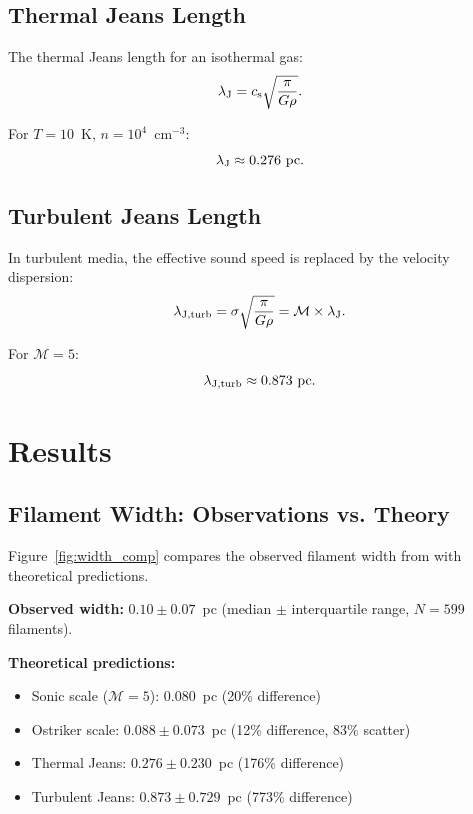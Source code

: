 \documentclass{mnras}
\begin{document}
\subsection{Thermal Jeans Length}

The thermal Jeans length for an isothermal gas:
\begin{equation}
\lambda_{\rm J} = c_{\rm s} \sqrt{\frac{\pi}{G\rho}}.
\label{eq:jeans}
\end{equation}

For $T = 10$~K, $n = 10^4$~cm$^{-3}$:
\begin{equation}
\lambda_{\rm J} \approx 0.276~\text{pc}.
\end{equation}

\subsection{Turbulent Jeans Length}

In turbulent media, the effective sound speed is replaced by the velocity dispersion:
\begin{equation}
\lambda_{\rm J,turb} = \sigma \sqrt{\frac{\pi}{G\rho}} = \mathcal{M} \times \lambda_{\rm J}.
\end{equation}

For $\mathcal{M} = 5$:
\begin{equation}
\lambda_{\rm J,turb} \approx 0.873~\text{pc}.
\end{equation}

\section{Results}
\label{sec:results}

\subsection{Filament Width: Observations vs. Theory}

Figure~\ref{fig:width_comp} compares the observed filament width from \citet{Arzoumanian2019} with theoretical predictions.

\textbf{Observed width:} $0.10 \pm 0.07$~pc (median $\pm$ interquartile range, $N = 599$ filaments).

\textbf{Theoretical predictions:}
\begin{itemize}
  \item Sonic scale ($\mathcal{M} = 5$): $0.080$~pc (20\% difference)
  \item Ostriker scale: $0.088 \pm 0.073$~pc (12\% difference, 83\% scatter)
  \item Thermal Jeans: $0.276 \pm 0.230$~pc (176\% difference)
  \item Turbulent Jeans: $0.873 \pm 0.729$~pc (773\% difference)
\end{itemize}
\end{document}
